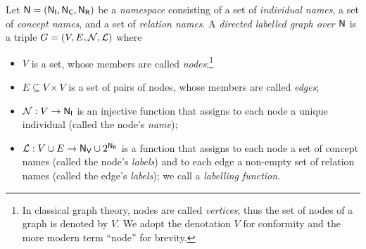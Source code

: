 %
\begin{definition}
  \label{def:ld_graph}
  Let $\textup{\textsf{N}}=(\mathsf{N}_\mathsf{I},\mathsf{N}_\mathsf{C},\mathsf{N}_\mathsf{R})$ be a \emph{namespace} consisting of a set \NI of \emph{individual names}, a set \NC of \emph{concept names}, and a set \NR of \emph{relation names}.
  A \emph{directed labelled graph over $\textup{\textsf{N}}$} is a triple $G = (V,E,\mathcal{N},\mathcal{L})$
  where
  \begin{itemize}
    \item
      $V$ is a set, whose members are called \emph{nodes};\footnote{%
        In classical graph theory, nodes are called \emph{vertices}; thus the set of
        nodes of a graph is denoted by $V$. We adopt the denotation $V$ for conformity
        and the more modern term ``node'' for brevity.%
      }      
    \item 
      $E \subseteq V \times V$ is a set of pairs of nodes, whose members are called \emph{edges};
    \item
      $\mathcal{N} : V \to \mathsf{N}_\mathsf{I}$ is an injective function that assigns
      to each node a unique individual (called the node's \emph{name});
    \item
      $\mathcal{L} : V \cup E \to \mathsf{N}_\mathsf{V} \cup 2^{\mathsf{N}_\mathsf{R}}$ is a function that assigns 
      to each node a set of concept names (called the node's \emph{labels}) and
      to each edge a non-empty set of relation names (called the edge's \emph{labels});
      we call \Lmc a \emph{labelling function}.
  \end{itemize}
\end{definition}
